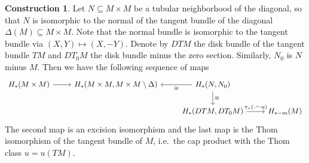 \documentclass{scrartcl}
\theoremstyle{plain}
\theoremstyle{definition}
\newtheorem{construction}[theorem]{Construction}
\renewcommand{\subset}{\subseteq}
\newcommand{\capp}{\mathbin{\frown}}
\newcommand{\iso}{\cong}
\begin{document}
\begin{construction}\label{constr:isect-via-tubular}
Let $N\subset M\times M$ be a tubular neighborhood of the diagonal, so that $N$ is isomorphic to the normal of the tangent bundle of the diagonal $\Delta(M)\subset M\times M$. Note that the normal bundle is isomorphic to the tangent bundle via $(X, Y)\mapsto (X, -Y)$. Denote by $DTM$ the disk bundle of the tangent bundle $TM$ and $DT_0M$ the disk bundle minus the zero section. Similarly, $N_0$ is $N$ minus $M$. Then we have the following sequence of maps
\begin{equation}
\begin{tikzcd}
    H_*(M\times M) \rar & H_*(M\times M, M\times M\setminus \Delta) & \lar["\iso"] H_*(N, N_0) \dar["\iso"] &\ \\
    & & H_*(DTM, DT_0M) \rar["\pi_*(\cdot \capp u)"] & H_{*-m}(M)
\end{tikzcd}
\end{equation}
The second map is an excision isomorphism and the last map is the Thom isomorphism of the tangent bundle of $M$, i.e.\ the cap product with the Thom class $u=u(TM)$. 
\end{construction}
\end{document}
